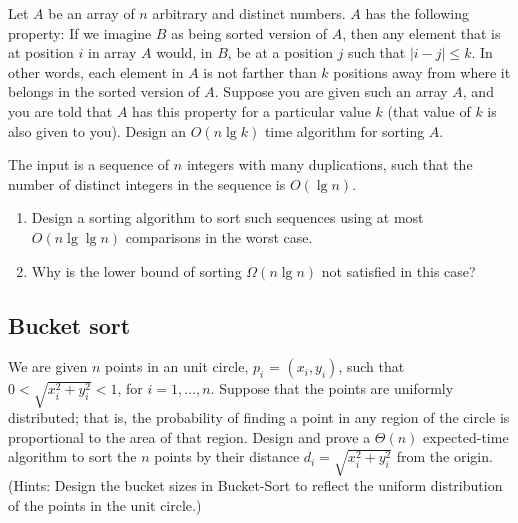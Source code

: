 \begin{refsection}
\begin{Exercise}
Let $A$ be an array of $n$ arbitrary and distinct numbers. $A$ has the following property: If we imagine $B$ as being sorted version of $A$, then any element that is at position $i$ in array $A$ would, in $B$, be at a position $j$ such that $| i - j | \leq k$. In other words, each element in $A$ is not farther than $k$ positions away from where it belongs in the sorted version of $A$. Suppose you are given such an array $A$, and you are told that $A$ has this property for a particular value $k$ (that value of $k$ is also given to you). Design an $O(n \lg k)$ time algorithm for sorting $A$. 
\end{Exercise}
\begin{Answer}
\end{Answer}

\begin{Exercise}
The input is a sequence of $n$ integers with many duplications, such that the number of distinct integers in the sequence is $O(\lg n)$.
\begin{enumerate}
\item Design a sorting algorithm to sort such sequences using at most $O(n \lg \lg n)$ comparisons in the worst case.
\item Why is the lower bound of sorting $\Omega(n \lg n)$ not satisfied in this case? 
\end{enumerate}
\end{Exercise}
\begin{Answer}
\end{Answer}

\subsection{Bucket sort}
\begin{Exercise}
We are given $n$ points in an unit circle, $ p_i$ = $(x_i, y_i)$, such that $0 < \sqrt{x_i^2 + y_i^2} < 1$, for $i = 1, \dots, n$. Suppose that the points are uniformly distributed; that is, the probability of finding a point in any region of the circle is proportional to the area of that region. Design and prove a $\Theta(n)$ expected-time algorithm to sort the $n$ points by their distance $d_i = \sqrt{x_i^2 + y_i^2}$ from the origin. (Hints: Design the bucket sizes in Bucket-Sort to reflect the uniform distribution of the points in the unit circle.) 
\end{Exercise}
\begin{Answer}
\end{Answer}


\end{refsection}
